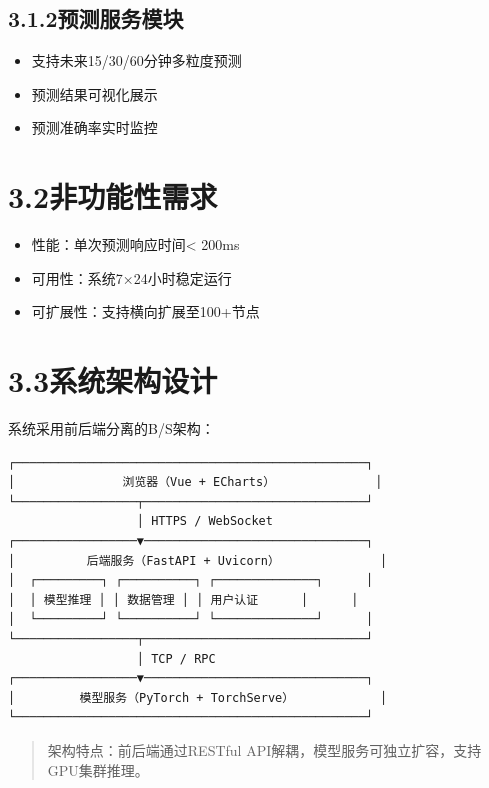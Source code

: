 \documentclass{harryopo-report}
\begin{document}
\subsection*{3.1.2预测服务模块}

\begin{itemize}
  \item 支持未来15/30/60分钟多粒度预测
  \item 预测结果可视化展示
  \item 预测准确率实时监控
\end{itemize}

\section*{3.2非功能性需求}

\begin{itemize}
  \item {\fzht 性能}：单次预测响应时间< 200ms
  \item {\fzht 可用性}：系统7×24小时稳定运行
  \item {\fzht 可扩展性}：支持横向扩展至100+节点
\end{itemize}

\section*{3.3系统架构设计}

系统采用前后端分离的B/S架构：

\begin{lstlisting}[style=plainstyle,caption={}]
┌─────────────────────────────────────────────────┐
│               浏览器（Vue + ECharts）              │
└─────────────────┬───────────────────────────────┘
                  │ HTTPS / WebSocket
┌─────────────────▼───────────────────────────────┐
│          后端服务（FastAPI + Uvicorn）              │
│  ┌─────────┐ ┌──────────┐ ┌──────────────┐      │
│  │ 模型推理 │ │ 数据管理 │ │ 用户认证      │      │
│  └─────────┘ └──────────┘ └──────────────┘      │
└─────────────────┬───────────────────────────────┘
                  │ TCP / RPC
┌─────────────────▼───────────────────────────────┐
│         模型服务（PyTorch + TorchServe）            │
└─────────────────────────────────────────────────┘
\end{lstlisting}

\begin{quote}
{\fzht 架构特点}：前后端通过RESTful API解耦，模型服务可独立扩容，支持GPU集群推理。
\end{quote}
\end{document}

